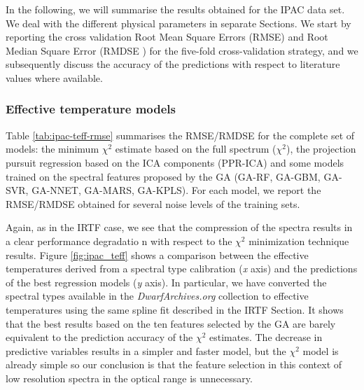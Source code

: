 
In the following, we will summarise the results obtained for the IPAC
data set. We deal with the different physical parameters in separate
Sections. We start by reporting the cross validation Root Mean Square
Errors (RMSE) and Root Median Square Error (RMDSE ) for the five-fold
cross-validation strategy, and we subsequently discuss the accuracy of
the predictions with respect to literature values where available.

\subsubsection{Effective temperature models}

Table \ref{tab:ipac-teff-rmse} summarises the RMSE/RMDSE for the
complete set of models: the minimum $\chi^2$ estimate based on the
full spectrum ($\chi^2$), the projection pursuit regression based on
the ICA components (PPR-ICA) and some models trained on the spectral
features proposed by the GA (GA-RF, GA-GBM, GA-SVR, GA-NNET, GA-MARS,
GA-KPLS). For each model, we report the RMSE/RMDSE obtained for
several noise levels of the training sets.

Again, as in the IRTF case, we see that the compression of the spectra
results in a clear performance degradatio n with respect to the
$\chi^2$ minimization technique results. Figure \ref{fig:ipac_teff} shows
a comparison between the effective temperatures derived from a
spectral type calibration ({\it x} axis) and the predictions of the
best regression models ({\it y} axis). In particular, we have
converted the spectral types available in the {\it DwarfArchives.org}
collection to effective temperatures using the same spline fit
described in the IRTF Section. It shows that the best results based on
the ten features selected by the GA are barely equivalent to the
prediction accuracy of the $\chi^2$ estimates. The decrease in
predictive variables results in a simpler and faster model, but the
$\chi^2$ model is already simple so our conclusion is that the feature
selection in this context of low resolution spectra in the optical
range is unnecessary.

